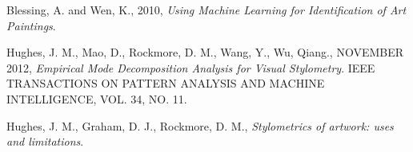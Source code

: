 \documentclass[twocolumn]{article}
\begin{document}
  \begin{thebibliography}{1}
     Blessing, A. and Wen, K.,
    2010,
    \emph{Using Machine Learning for Identification of Art Paintings}.
  
     Hughes, J. M., Mao, D., Rockmore, D. M.,
    Wang, Y., Wu, Qiang.,
    NOVEMBER 2012,
    \emph{Empirical Mode Decomposition Analysis for Visual Stylometry}.
    IEEE TRANSACTIONS ON PATTERN ANALYSIS AND MACHINE INTELLIGENCE,
    VOL. 34,
    NO. 11.
  
     Hughes, J. M., Graham, D. J., Rockmore, D. M.,
    \emph{Stylometrics of artwork: uses and limitations}.
  
  \end{thebibliography}
\end{document}
